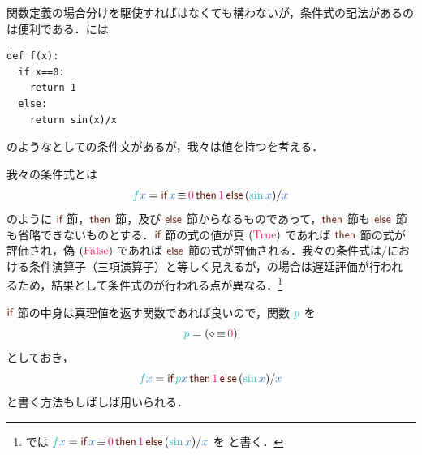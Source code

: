 \documentclass[a5paper,twoside,fleqn,draft]{jsbook}
\begin{document}
\separator

関数定義の場合分けを駆使すればはなくても構わないが，条件式の記法があるのは便利である．\python には
\begin{pythoncode}
\begin{verbatim}
def f(x):
  if x==0:
    return 1
  else:
    return sin(x)/x
\end{verbatim}
\end{pythoncode}
のようなとしての条件文があるが，我々は値を持つを考える．

我々の条件式とは
\begin{equation}
  \hFunc{f}\hVar{x}
  =\hIfSyntax{\hVar{x}\hIfEq\hConstant{0}}{\hConstant{1}}{{}(\hSin\hVar{x})/\hVar{x}}
\end{equation}
のように $\hIf$ 節，$\hThen$ 節，及び $\hElse$ 節からなるものであって，$\hThen$ 節も $\hElse$ 節も省略できないものとする．$\hIf$ 節の式の値が真 $(\hTrue)$ であれば $\mThen$ 節の式が評価され，偽 $(\hFalse)$ であれば $\hElse$ 節の式が評価される．我々の条件式は\clang/\cxx における条件演算子（三項演算子）と等しく見えるが，\haskell の場合は遅延評価が行われ
るため，結果として条件式のが行われる点が異なる．\footnote{\haskell では $\hFunc{f}\hVar{x}=\hIfSyntax{\hVar{x}\hIfEq\hConstant{0}}{\hConstant{1}}{{}(\hSin\hVar{x})/\hVar{x}}$ を  と書く．}

$\hIf$ 節の中身は真理値を返す関数であれば良いので，関数 $\hFunc{p}$ を
\begin{equation}
  \hFunc{p}
  =(\hAnonParam\hIfEq\hConstant{0})
\end{equation}
としておき，
\begin{equation}
  \hFunc{f}\hVar{x}
  =\hIfSyntax{\hFunc{p}\hVar{x}}{\hConstant{1}}{{}(\hSin\hVar{x})/\hVar{x}}
\end{equation}
と書く方法もしばしば用いられる．

\end{document}
